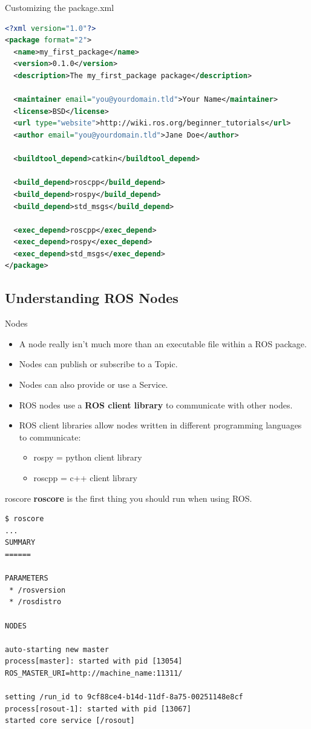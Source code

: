 \begin{frame}[fragile]{Customizing the package.xml}
\begin{lstlisting}[language=xml]
<?xml version="1.0"?>
<package format="2">
  <name>my_first_package</name>
  <version>0.1.0</version>
  <description>The my_first_package package</description>

  <maintainer email="you@yourdomain.tld">Your Name</maintainer>
  <license>BSD</license>
  <url type="website">http://wiki.ros.org/beginner_tutorials</url>
  <author email="you@yourdomain.tld">Jane Doe</author>

  <buildtool_depend>catkin</buildtool_depend>

  <build_depend>roscpp</build_depend>
  <build_depend>rospy</build_depend>
  <build_depend>std_msgs</build_depend>

  <exec_depend>roscpp</exec_depend>
  <exec_depend>rospy</exec_depend>
  <exec_depend>std_msgs</exec_depend>
</package>
\end{lstlisting}
\end{frame}

\subsection{Understanding ROS Nodes}

\begin{frame}{Nodes}
 \begin{itemize}
  \item A node really isn't much more than an executable file within a ROS package. 
  \item Nodes can publish or subscribe to a Topic. 
  \item Nodes can also provide or use a Service.
  \item ROS nodes use a \textbf{ROS client library} to communicate with other nodes. 
  \item ROS client libraries allow nodes written in different programming languages to communicate: 
   \begin{itemize}
    \item rospy = python client library 
    \item roscpp = c++ client library 
   \end{itemize}
 \end{itemize}
\end{frame}

\begin{frame}[fragile]{roscore}
\textbf{roscore} is the first thing you should run when using ROS. 
\begin{lstlisting}[language=shell]
$ roscore
...
SUMMARY
======

PARAMETERS
 * /rosversion
 * /rosdistro

NODES

auto-starting new master
process[master]: started with pid [13054]
ROS_MASTER_URI=http://machine_name:11311/

setting /run_id to 9cf88ce4-b14d-11df-8a75-00251148e8cf
process[rosout-1]: started with pid [13067]
started core service [/rosout]
\end{lstlisting}
\end{frame}

